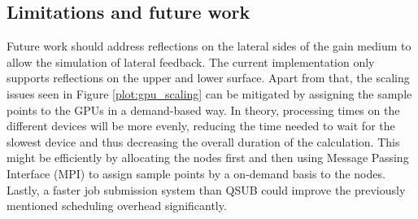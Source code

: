\subsection{Limitations and future work}
\label{subsec:limitations}
Future work should address reflections on the lateral sides of the gain medium
to allow the simulation of lateral feedback. The current implementation only
supports reflections on the upper and lower surface. Apart from that, the
scaling issues seen in Figure \ref{plot:gpu_scaling} can be mitigated by
assigning the sample points to the GPUs in a demand-based way. In theory,
processing times on the different devices will be more evenly, reducing the time
needed to wait for the slowest device and thus decreasing the overall duration
of the calculation. This might be efficiently by allocating the nodes first and
then using Message Passing Interface (MPI)\cite{MPI} to assign sample points by
a on-demand basis to the nodes. Lastly, a faster job submission system than QSUB
could improve the previously mentioned scheduling overhead significantly.
